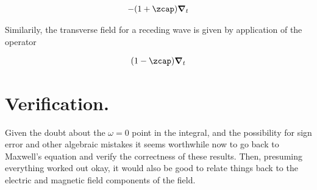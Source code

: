 \begin{align}\label{eqn:fooX}
-(1 + \zcap) \spacegrad_t
\end{align}

Similarily, the transverse field for a receding wave is given by application of the operator

\begin{align}\label{eqn:fooY}
(1 - \zcap) \spacegrad_t
\end{align}

\section{Verification.}

Given the doubt about the $\omega =0$ point in the integral, and the possibility for sign error and other algebraic mistakes it seems worthwhile now to go back to Maxwell's equation and verify the correctness of these results.  Then, presuming everything worked out okay, it would also be good to relate things back to the electric and magnetic field components of the field.

\EndArticle
